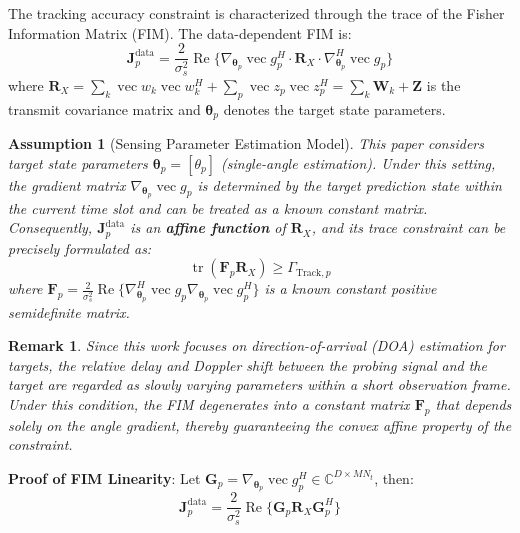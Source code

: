 \documentclass[12pt,a4paper]{article}
\DeclareMathOperator{\tr}{tr}
\DeclareMathOperator{\Real}{Re}
\DeclareMathOperator{\vect}{vec}
\newcommand{\mat}[1]{\mathbf{#1}}
\newtheorem{remark}{Remark}
\newtheorem{assumption}{Assumption}
\begin{document}
The tracking accuracy constraint is characterized through the trace of the Fisher Information Matrix (FIM). The data-dependent FIM is:
\begin{equation}
\mat{J}_p^{\text{data}} = \frac{2}{\sigma_s^2} \Real\Big\{ \nabla_{\boldsymbol{\theta}_p} \vect{g}_p^H \cdot \mat{R}_X \cdot \nabla_{\boldsymbol{\theta}_p}^H \vect{g}_p \Big\} \tag{11}
\end{equation}
where $\mat{R}_X = \sum_k \vect{w}_k \vect{w}_k^H + \sum_p \vect{z}_p \vect{z}_p^H = \sum_k \mat{W}_k + \mat{Z}$ is the transmit covariance matrix and $\boldsymbol{\theta}_p$ denotes the target state parameters.

\begin{assumption}[Sensing Parameter Estimation Model]\label{ass:1}
This paper considers target state parameters $\boldsymbol{\theta}_p = [\theta_p]$ (single-angle estimation). Under this setting, the gradient matrix $\nabla_{\boldsymbol{\theta}_p} \vect{g}_p$ is determined by the target prediction state within the current time slot and can be treated as a known constant matrix. Consequently, $\mat{J}_p^{\text{data}}$ is an \textbf{affine function} of $\mat{R}_X$, and its trace constraint can be precisely formulated as:
\begin{equation}
\tr(\mat{F}_p \mat{R}_X) \geq \Gamma_{\text{Track},p}
\end{equation}
where $\mat{F}_p = \frac{2}{\sigma_s^2} \Real\Big\{ \nabla_{\boldsymbol{\theta}_p}^H \vect{g}_p \nabla_{\boldsymbol{\theta}_p} \vect{g}_p^H \Big\}$ is a known constant positive semidefinite matrix.
\end{assumption}

\begin{remark}
Since this work focuses on direction-of-arrival (DOA) estimation for targets, the relative delay and Doppler shift between the probing signal and the target are regarded as slowly varying parameters within a short observation frame. Under this condition, the FIM degenerates into a constant matrix $\mat{F}_p$ that depends solely on the angle gradient, thereby guaranteeing the convex affine property of the constraint.
\end{remark}

\textbf{Proof of FIM Linearity}: Let $\mat{G}_p = \nabla_{\boldsymbol{\theta}_p} \vect{g}_p^H \in \mathbb{C}^{D \times MN_t}$, then:
\begin{equation}
\mat{J}_p^{\text{data}} = \frac{2}{\sigma_s^2} \Real\{ \mat{G}_p \mat{R}_X \mat{G}_p^H \}
\end{equation}
\end{document}
